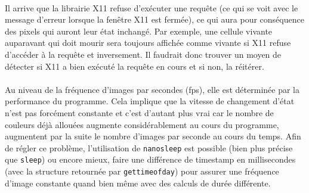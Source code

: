 \documentclass{report}
\begin{document}
\paragraph{} Il arrive que la librairie X11 refuse d'exécuter une requête (ce
qui se voit avec le message d'erreur lorsque la fenêtre X11 est fermée), ce qui
aura pour conséquence des pixels qui auront leur état inchangé. Par exemple,
une cellule vivante auparavant qui doit mourir sera toujours affichée comme
vivante si X11 refuse d'accéder à la requête et inversement. Il faudrait donc
trouver un moyen de détecter si X11 a bien exécuté la requête en cours et si
non, la réitérer.

\paragraph{} Au niveau de la fréquence d'images par secondes (fps), elle est
déterminée par la performance du programme. Cela implique que la vitesse de
changement d'état n'est pas forcément constante et c'est d'autant plus vrai car
le nombre de couleurs déjà allouées augmente considérablement au cours du
programme, augmentent par la suite le nombre d'images par seconde au cours du
temps. Afin de régler ce problème, l'utilisation de
\lstinline[style=prog]|nanosleep| est possible (bien plus précise que
\lstinline[style=prog]|sleep|) ou encore mieux, faire une différence de
timestamp en millisecondes (avec la structure retournée par
\lstinline[style=prog]|gettimeofday|) pour assurer une fréquence d'image
constante quand bien même avec des calculs de durée différente.
\end{document}
